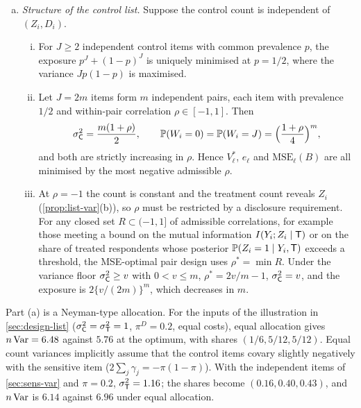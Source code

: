 \begin{theorem}
\begin{enumerate}[(a)]
  \item \emph{Structure of the control list.} Suppose the control count is independent of $(Z_i,D_i)$.
  \begin{enumerate}[(i)]
    \item For $J\ge2$ independent control items with common prevalence $p$, the exposure $p^J+(1-p)^J$ is uniquely minimised at $p=1/2$, where the variance $Jp(1-p)$ is maximised.
    \item Let $J=2m$ items form $m$ independent pairs, each item with prevalence $1/2$ and within-pair correlation $\rho\in[-1,1]$. Then
    \begin{equation}\label{eq:le-pairs}
      \sigma_{\mathsf{C}}^2=\frac{m(1+\rho)}2,\qquad \mathbb{P}(W_i=0)=\mathbb{P}(W_i=J)=\Bigl(\frac{1+\rho}4\Bigr)^m,
    \end{equation}
    and both are strictly increasing in $\rho$. Hence $V^*_\ell$, $e_\ell$ and $\mathrm{MSE}_\ell(B)$ are all minimised by the most negative admissible $\rho$.
    \item At $\rho=-1$ the count is constant and the treatment count reveals $Z_i$ (\cref{prop:list-var}(b)), so $\rho$ must be restricted by a disclosure requirement. For any closed set $R\subset(-1,1]$ of admissible correlations, for example those meeting a bound on the mutual information $I(Y_i;Z_i\mid\mathsf{T})$ or on the share of treated respondents whose posterior $\mathbb{P}(Z_i=1\mid Y_i,\mathsf{T})$ exceeds a threshold, the MSE-optimal pair design uses $\rho^*=\min R$. Under the variance floor $\sigma_{\mathsf{C}}^2\ge v$ with $0<v\le m$, $\rho^*=2v/m-1$, $\sigma_{\mathsf{C}}^2=v$, and the exposure is $2\{v/(2m)\}^m$, which decreases in $m$.
  \end{enumerate}
\end{enumerate}
\end{theorem}

Part (a) is a Neyman-type allocation. For the inputs of the illustration in \cref{sec:design-list} ($\sigma_{\mathsf{C}}^2=\sigma_{\mathsf{T}}^2=1$, $\pi^D=0.2$, equal costs), equal allocation gives $n\operatorname{Var}=6.48$ against $5.76$ at the optimum, with shares $(1/6,5/12,5/12)$. Equal count variances implicitly assume that the control items covary slightly negatively with the sensitive item ($2\sum_j\gamma_j=-\pi(1-\pi)$). With the independent items of \cref{sec:sens-var} and $\pi=0.2$, $\sigma_{\mathsf{T}}^2=1.16$; the shares become $(0.16,0.40,0.43)$, and $n\operatorname{Var}$ is $6.14$ against $6.96$ under equal allocation.

